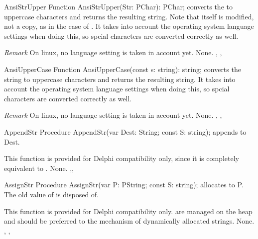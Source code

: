 
 
\begin{function}{AnsiStrUpper}
\Declaration
Function AnsiStrUpper(Str: PChar): PChar;
\Description
{} converts the   to uppercase characters 
and returns the resulting string. Note that  itself is modified,
not a copy, as in the case of .
It takes into account the operating system language
settings when doing this, so spcial characters are converted correctly as
well.

{\em Remark} On linux, no language setting is taken in account yet.
\Errors
None.
\SeeAlso
{}, , 
\end{function}


 
\begin{function}{AnsiUpperCase}
\Declaration
Function AnsiUpperCase(const s: string): string;
\Description
{} converts the string  to uppercase characters 
and returns the resulting string. 
It takes into account the operating system language
settings when doing this, so spcial characters are converted correctly as
well.

{\em Remark} On linux, no language setting is taken in account yet.
\Errors
None.
\SeeAlso
{}, , 
\end{function}


 
\begin{procedure}{AppendStr}
\Declaration
Procedure AppendStr(var Dest: String; const S: string);
\Description
{} appends  to Dest. 

This function is provided for Delphi
compatibility only, since it is completely equivalent to .
\Errors
None.
\SeeAlso
{},, 
\end{procedure}


 
\begin{procedure}{AssignStr}
\Declaration
Procedure AssignStr(var P: PString; const S: string);
\Description
{} allocates  to P. The old value of  is
disposed of.

This function is provided for Delphi compatibility only. 
are managed on the heap and should be preferred to the mechanism of
dynamically allocated strings.
\Errors
None.
\SeeAlso
{}, , 
\end{procedure}

